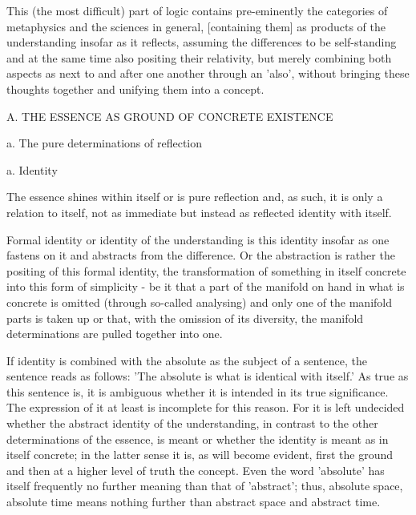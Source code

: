     This (the most difficult) part of logic contains pre-eminently
    the categories of metaphysics and the sciences in general,
    [containing them] as products of the understanding insofar as it reflects,
    assuming the differences to be self-standing and
    at the same time also positing their relativity,
    but merely combining both aspects as next to
    and after one another through an 'also',
    without bringing these thoughts together
    and unifying them into a concept.

A. THE ESSENCE AS GROUND OF CONCRETE EXISTENCE

a. The pure determinations of reflection

a. Identity

The essence shines within itself or is pure reflection and, as such,
it is only a relation to itself, not as immediate but instead as
reflected identity with itself.

    Formal identity or identity of the understanding is this identity
    insofar as one fastens on it and abstracts from the difference.
    Or the abstraction is rather the positing of this formal identity,
    the transformation of something in itself concrete into this form of
    simplicity - be it that a part of the manifold on hand in what is
    concrete is omitted (through so-called analysing) and only one of the
    manifold parts is taken up or that, with the omission of its diversity,
    the manifold determinations are pulled together into one.

    If identity is combined with the absolute as the subject of a sentence,
    the sentence reads as follows:
    'The absolute is what is identical with itself.'
    As true as this sentence is, it is ambiguous whether it is intended
    in its true significance.
    The expression of it at least is incomplete for this reason.
    For it is left undecided whether the abstract identity of the understanding,
    in contrast to the other determinations of the essence, is meant or
    whether the identity is meant as in itself concrete;
    in the latter sense it is, as will become evident,
    first the ground and then at a higher level of truth the concept.
    Even the word 'absolute' has itself frequently no further
    meaning than that of 'abstract';
    thus, absolute space, absolute time means nothing further than
    abstract space and abstract time.

